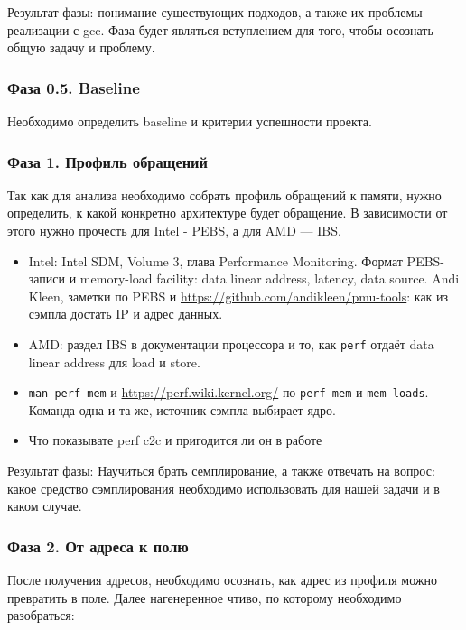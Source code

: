 \documentclass[a4paper,12pt]{article}
\begin{document}
Результат фазы: понимание существующих подходов, а также их проблемы реализации
с gcc. Фаза будет являться вступлением для того, чтобы осознать общую задачу и проблему.

\subsubsection{Фаза 0.5. Baseline}

Необходимо определить baseline и критерии успешности проекта. 

\subsubsection{Фаза 1. Профиль обращений}

Так как для анализа необходимо собрать профиль обращений к памяти, нужно
определить, к какой конкретно архитектуре будет обращение. В зависимости от
этого нужно прочесть для Intel - PEBS, а для AMD --- IBS.

\begin{ai}
\begin{itemize}
    \item Intel: Intel SDM, Volume 3, глава Performance Monitoring.
    Формат PEBS-записи и memory-load facility: data linear address,
    latency, data source. Andi Kleen,
    заметки по PEBS и \url{https://github.com/andikleen/pmu-tools}:
    как из сэмпла достать IP и адрес данных.
    \item AMD: раздел IBS в документации процессора и то, как
    \texttt{perf} отдаёт data linear address для load и store.
    \item \texttt{man perf-mem} и
    \url{https://perf.wiki.kernel.org/} по \texttt{perf mem} и
    \texttt{mem-loads}. Команда одна и та же, источник сэмпла
    выбирает ядро.
    \item Что показывате perf c2c и пригодится ли он в работе
\end{itemize}
\end{ai}


Результат фазы: Научиться брать семплирование, а также отвечать на вопрос: какое
средство сэмплирования необходимо использовать для нашей задачи и в каком
случае. 

\subsubsection{Фаза 2. От адреса к полю}

После получения адресов, необходимо осознать, как адрес из профиля можно
превратить в поле. Далее нагенеренное чтиво, по которому необходимо разобраться: 
\end{document}
